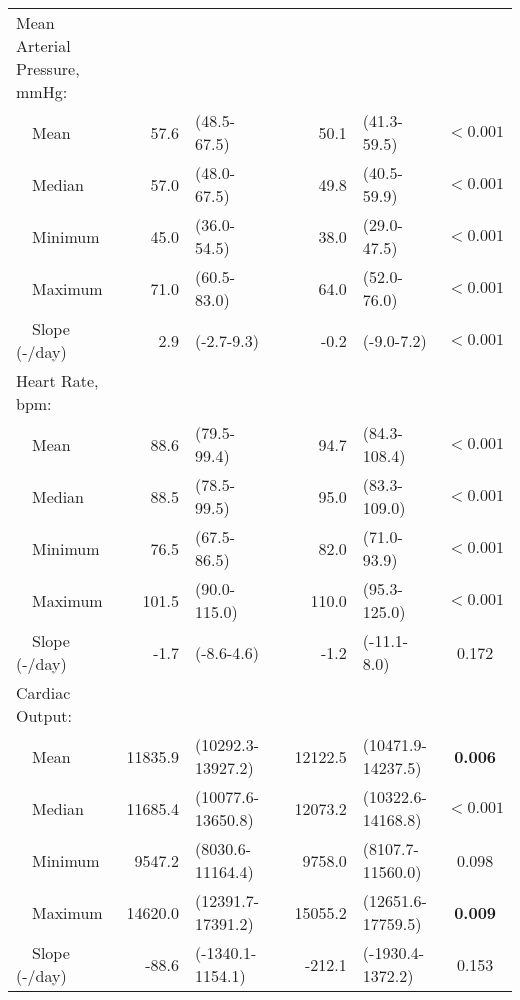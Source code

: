 {\begin{tabular}{l r l c r l c}
Mean Arterial Pressure, mmHg: & & & & & & \\ 
~~Mean & 57.6 & (48.5-67.5) & & 50.1 & (41.3-59.5) & $\mathbf{<0.001}$ \\ 
~~Median & 57.0 & (48.0-67.5) & & 49.8 & (40.5-59.9) & $\mathbf{<0.001}$ \\ 
~~Minimum & 45.0 & (36.0-54.5) & & 38.0 & (29.0-47.5) & $\mathbf{<0.001}$ \\ 
~~Maximum & 71.0 & (60.5-83.0) & & 64.0 & (52.0-76.0) & $\mathbf{<0.001}$ \\ 
~~Slope (-/day) & 2.9 & (-2.7-9.3) & & -0.2 & (-9.0-7.2) & $\mathbf{<0.001}$ \\ 
Heart Rate, bpm: & & & & & & \\ 
~~Mean & 88.6 & (79.5-99.4) & & 94.7 & (84.3-108.4) & $\mathbf{<0.001}$ \\ 
~~Median & 88.5 & (78.5-99.5) & & 95.0 & (83.3-109.0) & $\mathbf{<0.001}$ \\ 
~~Minimum & 76.5 & (67.5-86.5) & & 82.0 & (71.0-93.9) & $\mathbf{<0.001}$ \\ 
~~Maximum & 101.5 & (90.0-115.0) & & 110.0 & (95.3-125.0) & $\mathbf{<0.001}$ \\ 
~~Slope (-/day) & -1.7 & (-8.6-4.6) & & -1.2 & (-11.1-8.0) & 0.172 \\ 
Cardiac Output: & & & & & & \\ 
~~Mean & 11835.9 & (10292.3-13927.2) & & 12122.5 & (10471.9-14237.5) & \textbf{0.006} \\ 
~~Median & 11685.4 & (10077.6-13650.8) & & 12073.2 & (10322.6-14168.8) & $\mathbf{<0.001}$ \\ 
~~Minimum & 9547.2 & (8030.6-11164.4) & & 9758.0 & (8107.7-11560.0) & 0.098 \\ 
~~Maximum & 14620.0 & (12391.7-17391.2) & & 15055.2 & (12651.6-17759.5) & \textbf{0.009} \\ 
~~Slope (-/day) & -88.6 & (-1340.1-1154.1) & & -212.1 & (-1930.4-1372.2) & 0.153 \\ 
\bottomrule
\end{tabular}
}

